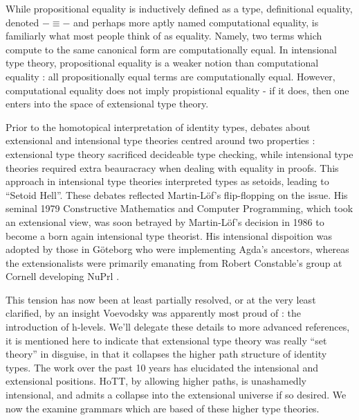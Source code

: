While propositional equality is inductively defined as a type, definitional
equality, denoted $-\equiv -$ and perhaps more aptly named computational
equality, is familiarly what most people think of as equality. Namely, two terms
which compute to the same canonical form are computationally equal. In
intensional type theory, propositional equality is a weaker notion than
computational equality : all propositionally equal terms are computationally
equal. However, computational equality does not imply propistional equality - if
it does, then one enters into the space of extensional type theory.

Prior to the homotopical interpretation of identity types, debates about
extensional and intensional type theories centred around two properties :
extensional type theory sacrificed decideable type checking, while intensional
type theories required extra beauracracy when dealing with equality in proofs.
This approach in intensional type theories interpreted types as setoids, leading
to ``Setoid Hell''. These debates reflected Martin-Löf's flip-flopping on the
issue. His seminal 1979 Constructive Mathematics and Computer Programming, which
took an extensional view, was soon betrayed by Martin-Löf's decision in 1986 to
become a born again intensional type theorist. His intensional dispoition was
adopted by those in Göteborg who were implementing Agda's ancestors, whereas the
extensionalists were primarily emanating from Robert Constable's group at
Cornell developing NuPrl \cite{nuprl}.

This tension has now been at least partially resolved, or at the very least
clarified, by an insight Voevodsky was apparently most proud of : the
introduction of h-levels. We'll delegate these details to more advanced
references, it is mentioned here to indicate that extensional type theory was
really ``set theory'' in disguise, in that it collapses the higher path
structure of identity types. The work over the past 10 years has elucidated the
intensional and extensional positions. HoTT, by allowing higher paths, is
unashamedly intensional, and admits a collapse into the extensional universe if
so desired. We now the examine grammars which are based of these higher type
theories.
